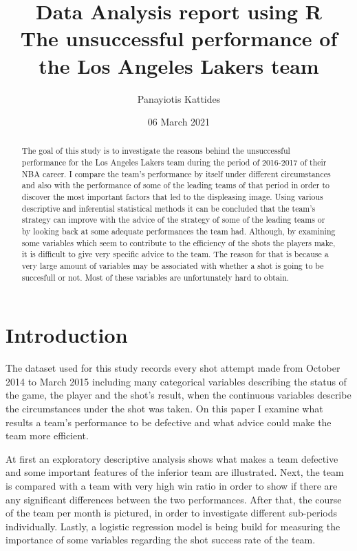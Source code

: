 \documentclass[
  11pt,
]{article}
\title{Data Analysis report using R\\
The unsuccessful performance of the Los Angeles Lakers team}
\author{Panayiotis Kattides}
\date{06 March 2021}
\begin{document}
\maketitle
\begin{abstract}
The goal of this study is to investigate the reasons behind the unsuccessful performance for the Los Angeles Lakers team during the period of 2016-2017 of their NBA career. I compare the team's performance by itself under different circumstances and also with the performance of some of the leading teams of that period in order to discover the most important factors that led to the displeasing image. Using various descriptive and inferential statistical methods it can be concluded that the team's strategy can improve with the advice of the strategy of some of the leading teams or by looking back at some adequate performances the team had. Although, by examining some variables which seem to contribute to the efficiency of the shots the players make, it is difficult to give very specific advice to the team. The reason for that is because a very large amount of variables may be associated with whether a shot is going to be succesfull or not. Most of these variables are unfortunately hard to obtain.
\end{abstract}

{
\setcounter{tocdepth}{2}
\tableofcontents
}
\pagebreak

\hypertarget{intro}{%
\section{Introduction}\label{intro}}

The dataset used for this study records every shot attempt made from October 2014 to March 2015 including many categorical variables describing the status of the game, the player and the shot's result, when the continuous variables describe the circumstances under the shot was taken. On this paper I examine what results a team's performance to be defective and what advice could make the team more efficient.

At first an exploratory descriptive analysis shows what makes a team defective and some important features of the inferior team are illustrated. Next, the team is compared with a team with very high win ratio in order to show if there are any significant differences between the two performances. After that, the course of the team per month is pictured, in order to investigate different sub-periods individually. Lastly, a logistic regression model is being build for measuring the importance of some variables regarding the shot success rate of the team.
\end{document}
